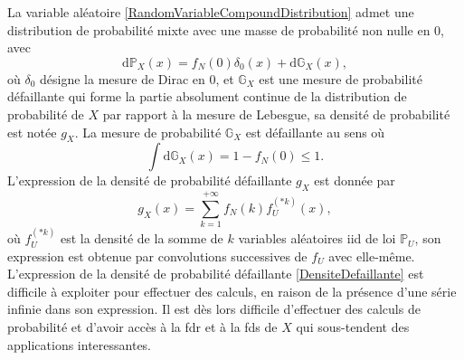 La variable aléatoire \eqref{RandomVariableCompoundDistribution} admet une distribution de probabilité mixte avec une masse de probabilité non nulle en $0$, avec
\begin{equation}
\text{d}\mathbb{P}_{X}(x)=f_{N}(0)\delta_{0}(x)+\text{d}\mathbb{G}_{X}(x),
\end{equation}
où $\delta_{0}$ désigne la mesure de Dirac en $0$, et $\mathbb{G}_{X}$ est une mesure de probabilité défaillante qui forme la partie absolument continue de la distribution de probabilité de $X$ par rapport à la mesure de Lebesgue, sa densité de probabilité est notée $g_{X}$. La mesure de probabilité $\mathbb{G}_{X}$ est défaillante au sens où 
\begin{equation*}
\int \text{d}\mathbb{G}_{X}(x)=1-f_{N}(0)\leq 1.
\end{equation*}
L\rq{}expression de la densité de probabilité défaillante $g_{X}$ est donnée par
\begin{equation}\label{DensiteDefaillante}
g_{X}(x)=\sum_{k=1}^{+\infty}f_{N}(k)f_{U}^{(*k)}(x),
\end{equation}
où $f_{U}^{(*k)}$ est la densité de la somme de $k$ variables aléatoires \gls{iid} de loi $\mathbb{P}_{U}$, son expression est obtenue par convolutions successives de $f_{U}$ avec elle-même. L\rq{}expression de la densité de probabilité défaillante \eqref{DensiteDefaillante} est difficile à exploiter pour effectuer des calculs, en raison de la présence d\rq{}une série infinie dans son expression. Il est dès lors difficile d\rq{}effectuer des calculs de probabilité et d\rq{}avoir accès à la \gls{fdr} et à la \gls{fds} de $X$ qui sous-tendent des applications interessantes.\\ 

